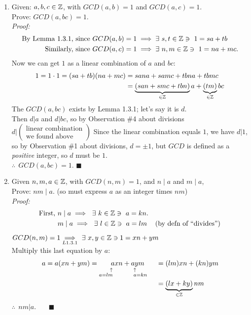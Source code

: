 \begin{enumerate}
    \item Given: $a, b, c \in {\mathbb{Z}}$, with $GCD(a, b) = 1$ and $GCD(a, c) = 1$.\\
    Prove: $GCD(a, bc) = 1$.\\

          \textit{Proof:}  
          \begin{align*}
            \text{By Lemma 1.3.1, since } &GCD(a, b) = 1 \implies \exists \ s, t \in \Z \ni \ 1=sa+tb \\
          \text{Similarly, since } &GCD(a, c) = 1 \implies \exists \ n, m \in \Z \ni \ 1 = na + mc.
          \end{align*}
          Now we can get $1$ as a linear combination of $a$ and $bc$:
          \begin{align*}
            1 = 1\cdot 1 = (sa+tb)(na+mc) &= sana + samc +tbna +tbmc \\
            &= \underbrace{(san + smc + tbn)}_{\in {\mathbb{Z}}}a + \underbrace{(tm)}_{\in {\mathbb{Z}}}bc
          \end{align*}
          The $GCD(a,bc)$ exists by Lemma 1.3.1; let's say it is $d$. \\
          Then $d|a$ and $d|bc$, so by Observation \#4 about divisions $d|(\substack{\text{linear combination} \\ \text{we found above}})$
          Since the linear combination equals $1$, we have $d|1$, so by Observation \#1 about divisions, $d=\pm 1$, but $GCD$ is defined as a \textit{positive} integer, so $d$ must be $1$. \\
          $\therefore \ \ GCD(a,bc)=1$. $\blacksquare$
          \newpage 
    \item Given $n, m, a \in {\mathbb{Z}}$, with $GCD(n, m) = 1$, and $n \mid a$ and $m \mid a$, \\
    Prove: $nm \mid a$. (so must express $a$ as an integer times $nm$) \\

          \noindent \textit{Proof:}  
          \begin{align*}
            \text{First, } &n \mid a \implies \ \exists \ k \in {\mathbb{Z}} \ni \ a = kn.  & \\
            & m \mid a \implies \ \exists \ l \in {\mathbb{Z}} \ni \ a = l m  & (\text{by defn of ``divides''})
          \end{align*}
          $GCD(n, m) = 1 \underset{L 1.3.1}{\implies} \ \exists \ x, y \in {\mathbb{Z}} \ni 1 = xn+ym$ \\
          Multiply this last equation by $a$:
          \begin{align*}
            a = a(xn + ym) = \underset{\substack{\uparrow \ \ \ \ \ \ \ \ \ \uparrow \ \ \ \ \\ a=lm \ \ \ \ \ \ \ \ \ a=kn \ \ \ \ }}{axn+aym} &= (lm)xn + (kn)ym \\ 
            &= \underbrace{(lx+ky)}_{\in \Z}nm
          \end{align*}
          $\therefore \ \ nm | a$. \ \ \ $\blacksquare$
\end{enumerate}


